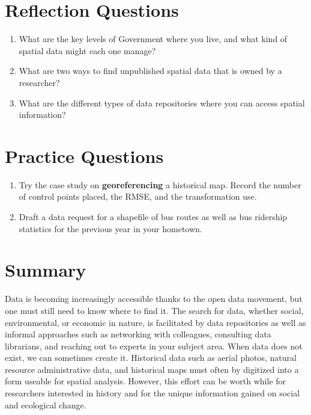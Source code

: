 \documentclass[
]{book}
\providecommand{\tightlist}{%
  \setlength{\itemsep}{0pt}\setlength{\parskip}{0pt}}
\begin{document}
\hypertarget{reflection-questions-2}{%
\section{Reflection Questions}\label{reflection-questions-2}}

\begin{enumerate}
\def\labelenumi{\arabic{enumi}.}
\tightlist
\item
  What are the key levels of Government where you live, and what kind of spatial data might each one manage?
\item
  What are two ways to find unpublished spatial data that is owned by a researcher?
\item
  What are the different types of data repositories where you can access spatial information?
\end{enumerate}

\hypertarget{practice-questions-2}{%
\section{Practice Questions}\label{practice-questions-2}}

\begin{enumerate}
\def\labelenumi{\arabic{enumi}.}
\tightlist
\item
  Try the case study on \textbf{georeferencing} a historical map. Record the number of control points placed, the RMSE, and the transformation use.
\item
  Draft a data request for a shapefile of bus routes as well as bus ridership statistics for the previous year in your hometown.
\end{enumerate}

\hypertarget{summary-4}{%
\section{Summary}\label{summary-4}}

Data is becoming increasingly accessible thanks to the open data movement, but one must still need to know where to find it. The search for data, whether social, environmental, or economic in nature, is facilitated by data repositories as well as informal approaches such as networking with colleagues, consulting data librarians, and reaching out to experts in your subject area. When data does not exist, we can sometimes create it. Historical data such as aerial photos, natural resource administrative data, and historical maps must often by digitized into a form useable for spatial analysis. However, this effort can be worth while for researchers interested in history and for the unique information gained on social and ecological change.
\end{document}
